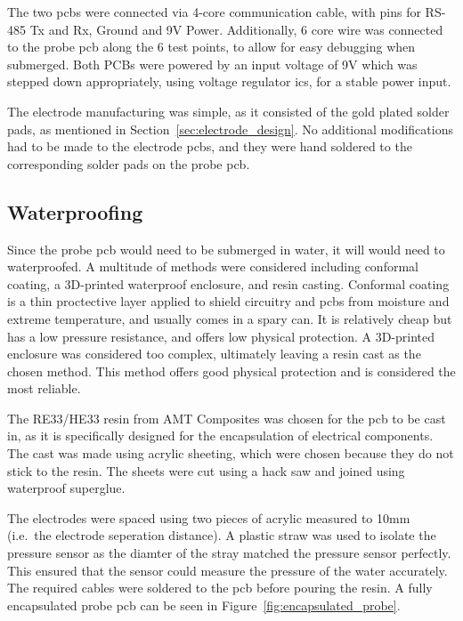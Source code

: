 \hfill \break

The two \gls{pcb}s were connected via 4-core communication cable, with pins for RS-485 Tx and Rx, Ground and 9V Power.
Additionally, 6 core wire was connected to the probe \gls{pcb} along the 6 test points, to allow for easy debugging when submerged.
Both PCBs were powered by an input voltage of 9V which was stepped down appropriately, using voltage regulator \gls{ic}s, for a stable power input.

The electrode manufacturing was simple, as it consisted of the gold plated solder pads, as mentioned in Section~\ref{sec:electrode_design}.
No additional modifications had to be made to the electrode \gls{pcb}s, and they were hand soldered to the corresponding solder pads on the probe \gls{pcb}.

\subsection{Waterproofing}\label{sec:waterproofing}
Since the probe \gls{pcb} would need to be submerged in water, it will would need to waterproofed.
A multitude of methods were considered including conformal coating, a 3D-printed waterproof enclosure, and resin casting.
Conformal coating is a thin proctective layer applied to shield circuitry and \gls{pcb}s from moisture and extreme temperature, and usually comes in a spary can.
It is relatively cheap but has a low pressure resistance, and offers low physical protection.
A 3D-printed enclosure was considered too complex, ultimately leaving a resin cast as the chosen method.
This method offers good physical protection and is considered the most reliable.

The RE33/HE33 resin from AMT Composites was chosen for the \gls{pcb} to be cast in, as it is specifically designed for the encapsulation of electrical components.
The cast was made using acrylic sheeting, which were chosen because they do not stick to the resin.
The sheets were cut using a hack saw and joined using waterproof superglue.

The electrodes were spaced using two pieces of acrylic measured to 10mm (i.e.~the electrode seperation distance).
A plastic straw was used to isolate the pressure sensor as the diamter of the stray matched the pressure sensor perfectly.
This ensured that the sensor could measure the pressure of the water accurately.
The required cables were soldered to the \gls{pcb} before pouring the resin.
A fully encapsulated probe \gls{pcb} can be seen in Figure~\ref{fig:encapsulated_probe}.

